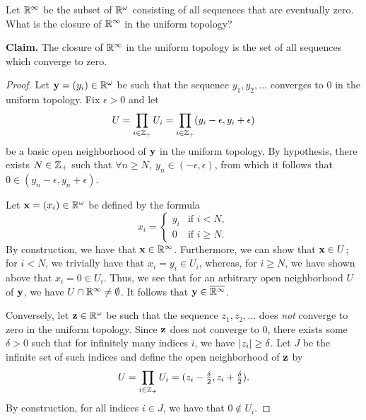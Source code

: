 \begin{exercise}[ID=2.20.5]
    Let $\mathbb{R}^\infty$ be the subset of $\mathbb{R}^\omega$ consisting of all sequences that are eventually zero.
    What is the closure of $\mathbb{R}^\infty$ in the uniform topology?
\end{exercise}
%
\begin{solution}
    \textbf{Claim.} The closure of $\mathbb{R}^\infty$ in the uniform topology is the set of all sequences which converge to zero.
    \begin{proof}
        Let $\mathbf{y} = (y_i) \in \mathbb{R}^\omega$ be such that the sequence $y_1, y_2, \ldots$ converges to $0$ in the uniform topology.
        Fix $\epsilon > 0$ and let
        \begin{equation*}
            U = \prod_{i\in\mathbb{Z}_+} U_i = \prod_{i\in\mathbb{Z}_+} (y_i - \epsilon, y_i + \epsilon)
        \end{equation*}
        be a basic open neighborhood of $\mathbf{y}$ in the uniform topology.
        By hypothesis, there exists $N \in \mathbb{Z}_+$ such that $\forall n \geq N,~ y_n \in (-\epsilon, \epsilon)$, from which it follows that $0 \in (y_n - \epsilon, y_n + \epsilon)$.

        Let $\mathbf{x} = (x_i) \in \mathbb{R}^\omega$ be defined by the formula
        \begin{equation*}
            x_i = \begin{cases}
                y_i & \text{if } i < N, \\
                0   & \text{if } i \geq N.
            \end{cases}
        \end{equation*}
        By construction, we have that $\mathbf{x} \in \mathbb{R}^\infty$.
        Furthermore, we can show that $\mathbf{x} \in U$;
        for $i < N$, we trivially have that $x_i = y_i \in U_i$, whereas, for $i \geq N$, we have shown above that $x_i = 0 \in U_i$.
        Thus, we see that for an arbitrary open neighborhood $U$ of $\mathbf{y}$, we have $U \cap \mathbb{R}^\infty \neq \emptyset$.
        It follows that $\mathbf{y} \in \overline{\mathbb{R}^\infty}$.

        Conversely, let $\mathbf{z} \in \mathbb{R}^\omega$ be such that the sequence $z_1, z_2, \ldots$ does \textit{not} converge to zero in the uniform topology.
        Since $\mathbf{z}$ does not converge to $0$, there exists some $\delta > 0$ such that for infinitely many indices $i$, we have $\left| z_i \right| \geq \delta$.
        Let $J$ be the infinite set of such indices and define the open neighborhood of $\mathbf{z}$ by
        \begin{equation*}
            U = \prod_{i\in\mathbb{Z}_+} U_i = (z_i - \tfrac{\delta}{2}, z_i + \tfrac{\delta}{2}).
        \end{equation*}
        By construction, for all indices $i \in J$, we have that $0 \not\in U_i$.


\end{proof}
\end{solution}
